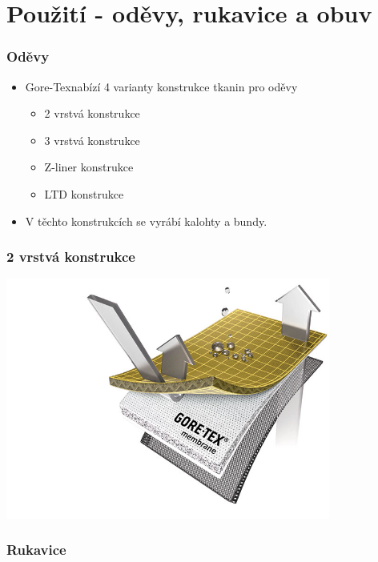 \section{Použití - oděvy, rukavice a obuv}

\begin{frame}
	\frametitle{Oděvy}
	
	\begin{itemize}
		\item Gore-Tex\textregistered nabízí 4 varianty konstrukce tkanin pro oděvy
		\begin{itemize}
			\item 2 vrstvá konstrukce %
			\item 3 vrstvá konstrukce %
			\item Z-liner konstrukce %
			\item LTD konstrukce %
		\end{itemize}
	  	\item V těchto konstrukcích se vyrábí kalohty a bundy.
	  
	\end{itemize}
	
\end{frame}
\begin{frame}
	\frametitle{2 vrstvá konstrukce}
			\includegraphics[width=0.8\textwidth]{bunda_close.jpg}
	
\end{frame}

\begin{frame}
	\frametitle{Rukavice}
	
\end{frame}

